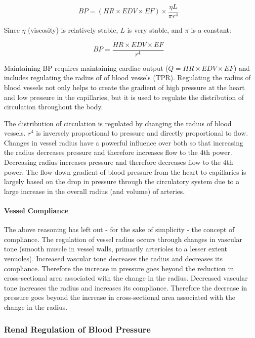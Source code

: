 \begin{equation}
    BP = (HR \times EDV \times EF) \times \frac{\eta L}{\pi r^4}
\end{equation}

Since $\eta$ (viscosity) is relatively stable, $L$ is very stable, and $\pi$ is a constant:

\begin{equation}
    BP = \frac{HR \times EDV \times EF}{r^4} 
    \label{BP_expanded}
\end{equation}

Maintaining BP requires maintaining cardiac output ($\dot{Q} = HR \times EDV \times EF$) and includes regulating the radius of of blood vessels (TPR). Regulating the radius of blood vessels not only helps to create the gradient of high pressure at the heart and low pressure in the capillaries, but it is used to regulate the distribution of circulation throughout the body.

The distribution of circulation is regulated by changing the radius of blood vessels. $r^4$ is inversely proportional to pressure and directly proportional to flow. Changes in vessel radius have a powerful influence over both so that increasing the radius decreases pressure and therefore increases flow to the 4th power. Decreasing radius increases pressure and therefore decreases flow to the 4th power. The flow down gradient of blood pressure from the heart to capillaries is largely based on the drop in pressure through the circulatory system due to a large increase in the overall radius (and volume) of arteries.

\paragraph{Vessel Compliance}

The above reasoning has left out - for the sake of simplicity - the concept of compliance. The regulation of vessel radius occurs through changes in vascular tone (smooth muscle in vessel walls, primarily arterioles to a lesser extent venuoles). Increased vascular tone decreases the radius and decreases its compliance. Therefore the increase in pressure goes beyond the reduction in cross-sectional area associated with the change in the radius. Decreased vascular tone increases the radius and increases its compliance. Therefore the decrease in pressure goes beyond the increase in cross-sectional area associated with the change in the radius. 


\subsubsection{Renal Regulation of Blood Pressure}

